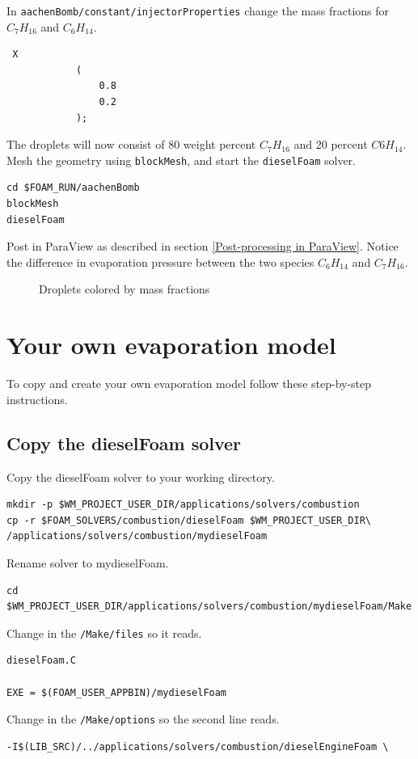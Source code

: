 \documentclass{report}
\begin{document}
\noindent 
In \verb+aachenBomb/constant/injectorProperties+ change the mass fractions for $C_{7}H_{16}$ and $C_{6}H_{14}$.
\begin{verbatim}
 X
            (
                0.8
                0.2
            );
\end{verbatim}
The droplets will now consist of 80 weight percent $C_{7}H_{16}$ and 20 percent $C{6}H_{14}$. Mesh the geometry using \verb+blockMesh+, and start the \verb+dieselFoam+ solver.
\begin{verbatim}
cd $FOAM_RUN/aachenBomb
blockMesh
dieselFoam              	
\end{verbatim} 
\noindent
Post in ParaView as described in section \ref{Post-processing in ParaView}. Notice the difference in evaporation pressure between the two species $C_{6}H_{14}$ and $C_{7}H_{16}$.

\begin{figure}[h]
  \centering
	\hspace{1in}               
  \caption{Droplets colored by mass fractions}
  \label{Droplets colored by mass fractions}
\end{figure}
\section{Your own evaporation model}
To copy and create your own evaporation model follow these step-by-step instructions.

\subsection{Copy the dieselFoam solver}
Copy the dieselFoam solver to your working directory.
\begin{verbatim}
mkdir -p $WM_PROJECT_USER_DIR/applications/solvers/combustion
cp -r $FOAM_SOLVERS/combustion/dieselFoam $WM_PROJECT_USER_DIR\
/applications/solvers/combustion/mydieselFoam     	
\end{verbatim}
\noindent
Rename solver to mydieselFoam.
\begin{verbatim}
cd $WM_PROJECT_USER_DIR/applications/solvers/combustion/mydieselFoam/Make
\end{verbatim}
\noindent
Change in the \verb+/Make/files+ so it reads.
\begin{verbatim}
dieselFoam.C

EXE = $(FOAM_USER_APPBIN)/mydieselFoam
\end{verbatim}
\noindent
Change in the \verb+/Make/options+ so the second line reads.
\begin{verbatim}
-I$(LIB_SRC)/../applications/solvers/combustion/dieselEngineFoam \
\end{verbatim}
\end{document}
